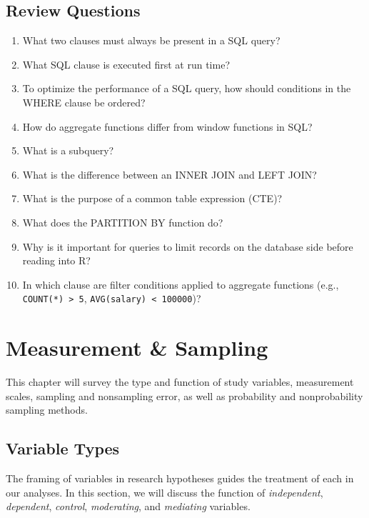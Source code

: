 \documentclass[
]{book}
\begin{document}
\hypertarget{review-questions-1}{%
\section{Review Questions}\label{review-questions-1}}

\begin{enumerate}
\def\labelenumi{\arabic{enumi}.}
\item
  What two clauses must always be present in a SQL query?
\item
  What SQL clause is executed first at run time?
\item
  To optimize the performance of a SQL query, how should conditions in the WHERE clause be ordered?
\item
  How do aggregate functions differ from window functions in SQL?
\item
  What is a subquery?
\item
  What is the difference between an INNER JOIN and LEFT JOIN?
\item
  What is the purpose of a common table expression (CTE)?
\item
  What does the PARTITION BY function do?
\item
  Why is it important for queries to limit records on the database side before reading into R?
\item
  In which clause are filter conditions applied to aggregate functions (e.g., \texttt{COUNT(*)\ \textgreater{}\ 5}, \texttt{AVG(salary)\ \textless{}\ 100000})?
\end{enumerate}

\hypertarget{measure-sampl}{%
\chapter{Measurement \& Sampling}\label{measure-sampl}}

This chapter will survey the type and function of study variables, measurement scales, sampling and nonsampling error, as well as probability and nonprobability sampling methods.

\hypertarget{variable-types}{%
\section{Variable Types}\label{variable-types}}

The framing of variables in research hypotheses guides the treatment of each in our analyses. In this section, we will discuss the function of \emph{independent}, \emph{dependent}, \emph{control}, \emph{moderating}, and \emph{mediating} variables.
\end{document}
